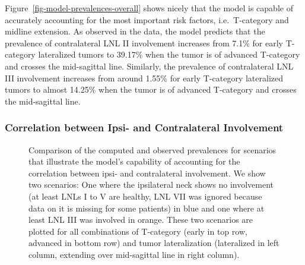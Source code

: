 \documentclass[
  sn-mathphys-num,
]{sn-jnl}
\begin{document}
Figure~\ref{fig-model-prevalences-overall} shows nicely that the model
is capable of accurately accounting for the most important risk factors,
i.e.~T-category and midline extension. As observed in the data, the
model predicts that the prevalence of contralateral LNL II involvement
increases from 7.1\% for early T-category lateralized tumors to 39.17\%
when the tumor is of advanced T-category and crosses the mid-sagittal
line. Similarly, the prevalence of contralateral LNL III involvement
increases from around 1.55\% for early T-category lateralized tumors to
almost 14.25\% when the tumor is of advanced T-category and crosses the
mid-sagittal line.

\subsubsection{Correlation between Ipsi- and Contralateral
Involvement}\label{correlation-between-ipsi--and-contralateral-involvement}

\begin{figure}


\caption{\label{fig-model-prevalences-with-ipsi}Comparison of the
computed and observed prevalences for scenarios that illustrate the
model's capability of accounting for the correlation between ipsi- and
contralateral involvement. We show two scenarios: One where the
ipsilateral neck shows no involvement (at least LNLs I to V are healthy,
LNL VII was ignored because data on it is missing for some patients) in
blue and one where at least LNL III was involved in orange. These two
scenarios are plotted for all combinations of T-category (early in top
row, advanced in bottom row) and tumor lateralization (lateralized in
left column, extending over mid-sagittal line in right column).}

\end{figure}%
\end{document}
